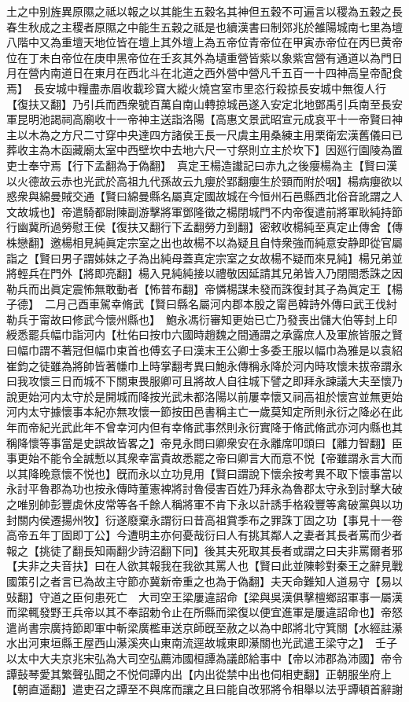 土之中别旌異原隰之祗以報之以其能生五穀名其神但五穀不可遍言以稷為五穀之長春生秋成之主稷者原隰之中能生五穀之祗是也續漢書曰制郊兆於雒陽城南七里為壇八階中又為重壇天地位皆在壇上其外壇上為五帝位青帝位在甲寅赤帝位在丙巳黄帝位在丁未白帝位在庚申黑帝位在壬亥其外為壝重營皆紫以象紫宫營有通道以為門日月在營内南道日在東月在西北斗在北道之西外營中營凡千五百一十四神高皇帝配食焉】　長安城中糧盡赤眉收載珍寶大縱火燒宫室市里恣行殺掠長安城中無復人行【復扶又翻】乃引兵而西衆號百萬自南山轉掠城邑遂入安定北地鄧禹引兵南至長安軍昆明池謁祠高廟收十一帝神主送詣洛陽【高惠文景武昭宣元成哀平十一帝賢曰神主以木為之方尺二寸穿中央達四方諸侯王長一尺虞主用桑練主用栗衛宏漢舊儀曰已葬收主為木函藏廟太室中西壁坎中去地六尺一寸祭則立主於坎下】因廵行園陵為置吏士奉守焉【行下孟翻為于偽翻】　真定王楊造䜟記曰赤九之後癭楊為主【賢曰漢以火德故云赤也光武於高祖九代孫故云九癭於郢翻癭生於頸而附於咽】楊病癭欲以惑衆與綿曼賊交通【賢曰綿曼縣名屬真定國故城在今恒州石邑縣西北俗音訛謂之人文故城也】帝遣騎都尉陳副游擊將軍鄧隆徵之楊閉城門不内帝復遣前將軍耿純持節行幽冀所過勞慰王侯【復扶又翻行下孟翻勞力到翻】密敕收楊純至真定止傳舍【傳株戀翻】邀楊相見純眞定宗室之出也故楊不以為疑且自恃衆強而純意安静即從官屬詣之【賢曰男子謂姊妹之子為出純母蓋真定宗室之女故楊不疑而來見純】楊兄弟並將輕兵在門外【將即亮翻】楊入見純純接以禮敬因延請其兄弟皆入乃閉閤悉誅之因勒兵而出眞定震怖無敢動者【怖普布翻】帝憐楊謀未發而誅復封其子為眞定王【楊子德】　二月己酉車駕幸脩武【賢曰縣名屬河内郡本殷之甯邑韓詩外傳曰武王伐紂勒兵于甯故曰修武今懷州縣也】　鮑永馮衍審知更始已亡乃發喪出儲大伯等封上印綬悉罷兵幅巾詣河内【杜佑曰按巾六國時趙魏之間通謂之承露庶人及軍旅皆服之賢曰幅巾謂不著冠但幅巾束首也傅玄子曰漢末王公卿士多委王服以幅巾為雅是以袁紹崔鈞之徒雖為將帥皆著㡘巾上時掌翻考異曰鮑永傳稱永降於河内時攻懷未拔帝謂永曰我攻懷三日而城不下關東畏服卿可且將故人自往城下譬之即拜永諫議大夫至懷乃說更始河内太守於是開城而降按光武未都洛陽以前屢幸懷又祠高祖於懷宫並無更始河内太守據懷事本紀亦無攻懷一節按田邑書稱主亡一歲莫知定所則永衍之降必在此年而帝紀光武此年不曾幸河内但有幸脩武事然則永衍實降于脩武脩武亦河内縣也其稱降懷等事當是史誤故皆畧之】帝見永問曰卿衆安在永離席叩頭曰【離力智翻】臣事更始不能令全誠慙以其衆幸富貴故悉罷之帝曰卿言大而意不悦【帝雖謂永言大而以其降晚意懷不悦也】旣而永以立功見用【賢曰謂說下懷余按考異不取下懷事當以永討平魯郡為功也按永傳時董憲裨將討魯侵害百姓乃拜永為魯郡太守永到討擊大破之唯别帥彭豐虡休皮常等各千餘人稱將軍不肯下永以計誘手格殺豐等禽破黨與以功封關内侯遷揚州牧】衍遂廢棄永謂衍曰昔高祖賞季布之罪誅丁固之功【事見十一卷高帝五年丁固即丁公】今遭明主亦何憂哉衍曰人有挑其鄰人之妻者其長者罵而少者報之【挑徒了翻長知兩翻少詩沼翻下同】後其夫死取其長者或謂之曰夫非罵爾者邪【夫非之夫音扶】曰在人欲其報我在我欲其罵人也【賢曰此並陳軫對秦王之辭見戰國策引之者言已為故主守節亦冀新帝重之也為于偽翻】夫天命難知人道易守【易以䜴翻】守道之臣何患死亡　大司空王梁屢違詔命【梁與吳漢俱擊檀鄉詔軍事一屬漢而梁輒發野王兵帝以其不奉詔勅令止在所縣而梁復以便宜進軍是屢違詔命也】帝怒遣尚書宗廣持節即軍中斬梁廣檻車送京師旣至赦之以為中郎將北守箕關【水經註濝水出河東垣縣王屋西山濝溪夾山東南流逕故城東即濝關也光武遣王梁守之】　壬子以太中大夫京兆宋弘為大司空弘薦沛國桓譚為議郎給事中【帝以沛郡為沛國】帝令譚鼔琴愛其繁聲弘聞之不悦伺譚内出【内出從禁中出也伺相吏翻】正朝服坐府上【朝直遥翻】遣吏召之譚至不與席而讓之且曰能自改邪將令相舉以法乎譚頓首辭謝